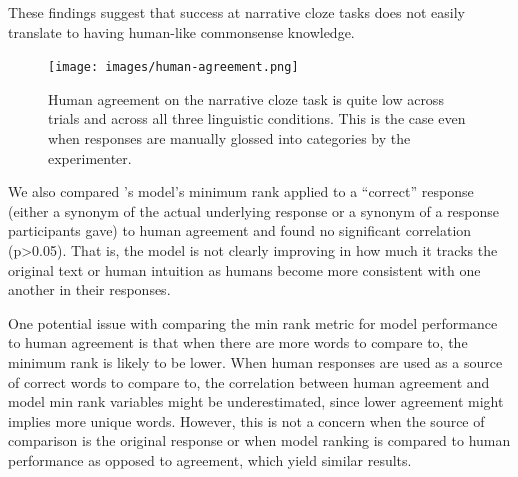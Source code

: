 \documentclass[10pt,a4paper]{article}
\begin{document}
These findings suggest that success at narrative cloze tasks does not easily translate to having human-like commonsense knowledge.

\begin{figure}
 \centering
 \texttt{[image: images/human-agreement.png]}
 \caption{Human agreement on the narrative cloze task is quite low across trials and across all three linguistic conditions. This is the case even when responses are manually glossed into categories by the experimenter.}
 \label{fig:human-agreement}
\end{figure}

We also compared 's model's minimum rank applied to a ``correct'' response (either a synonym of the actual underlying response or a synonym of a response participants gave) to human agreement and found no significant correlation (p>0.05). That is, the model is not clearly improving in how much it tracks the original text or human intuition as humans become more consistent with one another in their responses.

One potential issue with comparing the min rank metric for model performance to human agreement is that when there are more words to compare to, the minimum rank is likely to be lower. When human responses are used as a source of correct words to compare to, the correlation between human agreement and model min rank variables might be underestimated, since lower agreement might implies more unique words. However, this is not a concern when the source of comparison is the original response or when model ranking is compared to human performance as opposed to agreement, which yield similar results.

% 
% 
% 
% 
% 
\end{document}
